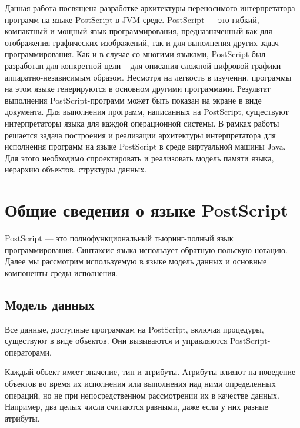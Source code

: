 Данная работа посвящена разработке архитектуры переносимого интерпретатора программ на языке PostScript \cite{plrm} в JVM-среде. PostScript —  это гибкий,  компактный и мощный язык	программирования, предназначенный как для отображения графических изображений, так и для выполнения других задач программирования. Как и в случае со многими языками, PostScript был разработан для конкретной цели – для описания сложной цифровой графики аппаратно-независимым образом. Несмотря на легкость в изучении, программы на этом языке генерируются в основном другими программами. Результат выполнения PostScript-программ может быть показан на экране в виде документа. Для выполнения программ, написанных на PostScript, существуют интерпретаторы языка для каждой  операционной системы.
В рамках работы решается задача построения и реализации архитектуры интерпретатора для исполнения программ на языке PostScript в среде виртуальной машины Java. Для этого необходимо спроектировать и реализовать модель памяти языка, иерархию объектов, структуры данных.

\section{Общие сведения о языке PostScript}
PostScript --- это полнофункциональный тьюринг-полный язык программирования. Синтаксис языка использует обратную польскую нотацию. Далее мы рассмотрим используемую в языке модель данных и основные компоненты среды исполнения.

\subsection{Модель данных}
Все данные, доступные программам на PostScript, включая процедуры, существуют в виде объектов. Они вызываются и управляются  PostScript-операторами. 

Каждый объект имеет значение, тип и атрибуты. Атрибуты влияют на поведение объектов во время их исполнения или выполнения над ними определенных операций, но не при непосредственном рассмотрении их в качестве данных. Например, два целых числа считаются равными, даже если у них разные атрибуты.

